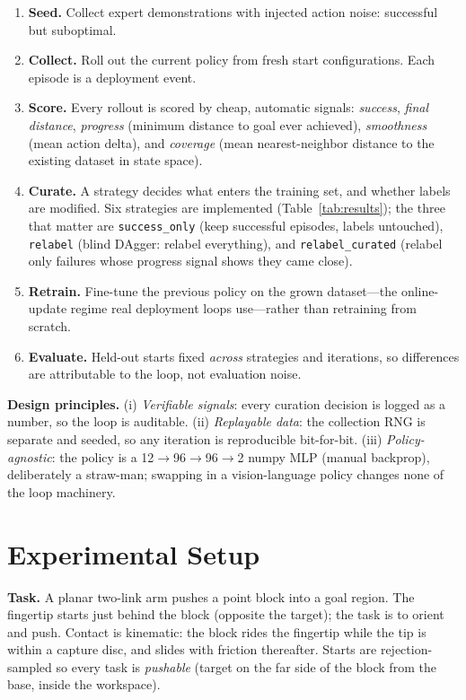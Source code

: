 \documentclass[conference]{IEEEtran}
\begin{document}
\begin{enumerate}
\item \textbf{Seed.} Collect expert demonstrations with injected action
noise: successful but suboptimal.
\item \textbf{Collect.} Roll out the current policy from fresh start
configurations. Each episode is a deployment event.
\item \textbf{Score.} Every rollout is scored by cheap, automatic signals:
\emph{success}, \emph{final distance}, \emph{progress} (minimum distance to
goal ever achieved), \emph{smoothness} (mean action delta), and
\emph{coverage} (mean nearest-neighbor distance to the existing dataset in
state space).
\item \textbf{Curate.} A strategy decides what enters the training set,
and whether labels are modified. Six strategies are implemented
(Table~\ref{tab:results}); the three that matter are
\texttt{success\_only} (keep successful episodes, labels untouched),
\texttt{relabel} (blind DAgger: relabel everything), and
\texttt{relabel\_curated} (relabel only failures whose progress signal
shows they came close).
\item \textbf{Retrain.} Fine-tune the previous policy on the grown
dataset---the online-update regime real deployment loops use---rather than
retraining from scratch.
\item \textbf{Evaluate.} Held-out starts fixed \emph{across} strategies and
iterations, so differences are attributable to the loop, not evaluation
noise.
\end{enumerate}

\textbf{Design principles.} (i) \emph{Verifiable signals}: every curation
decision is logged as a number, so the loop is auditable. (ii)
\emph{Replayable data}: the collection RNG is separate and seeded, so any
iteration is reproducible bit-for-bit. (iii) \emph{Policy-agnostic}: the
policy is a 12$\rightarrow$96$\rightarrow$96$\rightarrow$2 numpy MLP
(manual backprop), deliberately a straw-man; swapping in a vision-language
policy changes none of the loop machinery.

\section{Experimental Setup}
\textbf{Task.} A planar two-link arm pushes a point block into a goal
region. The fingertip starts just behind the block (opposite the target);
the task is to orient and push. Contact is kinematic: the block rides the
fingertip while the tip is within a capture disc, and slides with friction
thereafter. Starts are rejection-sampled so every task is \emph{pushable}
(target on the far side of the block from the base, inside the workspace).
\end{document}
